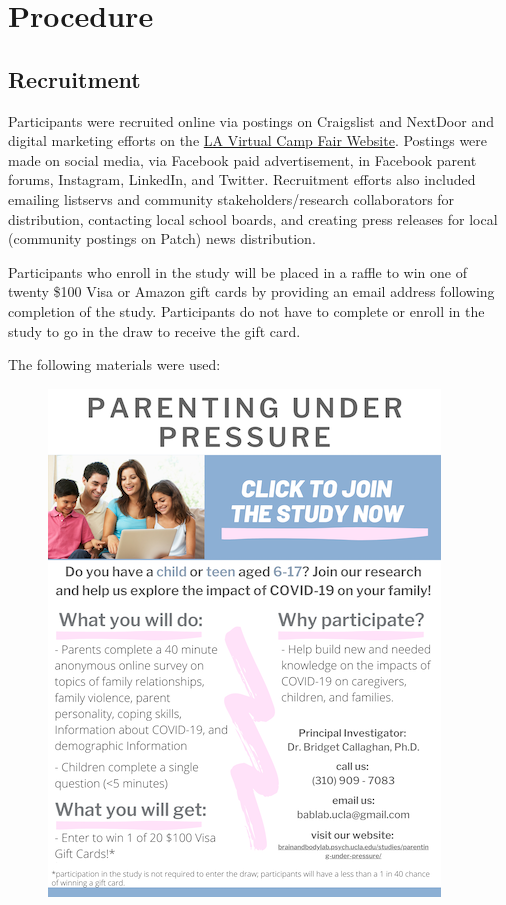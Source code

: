 \documentclass[]{book}
\begin{document}
\hypertarget{procedure}{%
\section{Procedure}\label{procedure}}

\hypertarget{recruitment}{%
\subsection{Recruitment}\label{recruitment}}

Participants were recruited online via postings on Craigslist and NextDoor and digital marketing efforts on the \href{https://www.vcampfair.com/brain-and-body-lab-ucla.html}{LA Virtual Camp Fair Website}. Postings were made on social media, via Facebook paid advertisement, in Facebook parent forums, Instagram, LinkedIn, and Twitter. Recruitment efforts also included emailing listservs and community stakeholders/research collaborators for distribution, contacting local school boards, and creating press releases for local (community postings on Patch) news distribution.

Participants who enroll in the study will be placed in a raffle to win one of twenty \$100 Visa or Amazon gift cards by providing an email address following completion of the study. Participants do not have to complete or enroll in the study to go in the draw to receive the gift card.

The following materials were used:

\begin{figure}
\centering
\includegraphics{images/flyer.png}
\caption{}
\end{figure}
\end{document}
